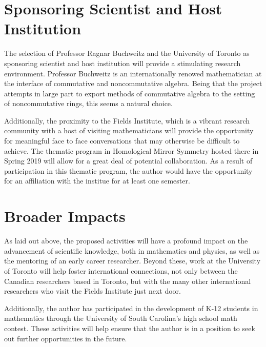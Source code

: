 \documentclass[11pt]{article}
\begin{document}
\section{Sponsoring Scientist and Host Institution}
The selection of Professor Ragnar Buchweitz and the University of Toronto as sponsoring scientist and host institution will provide a stimulating research environment.
Professor Buchweitz is an internationally renowed mathematician at the interface of commutative and noncommutative algebra.
Being that the project attempts in large part to export methods of commutative algebra to the setting of noncommutative rings, this seems a natural choice.

Additionally, the proximity to the Fields Institute, which is a vibrant research community with a host of visiting mathematicians will provide the opportunity for meaningful face to face conversations that may otherwise be difficult to achieve.
The thematic program in Homological Mirror Symmetry hosted there in Spring 2019 will allow for a great deal of potential collaboration.
As a result of participation in this thematic program, the author would have the opportunity for an affiliation with the institue for at least one semester.

\section{Broader Impacts}

As laid out above, the proposed activities will have a profound impact on the advancement of scientific knowledge, both in mathematics and physics, as well as the mentoring of an early career researcher.
Beyond these, work at the University of Toronto will help foster international connections, not only between the Canadian researchers based in Toronto, but with the many other international researchers who visit the Fields Institute just next door.

Additionally, the author has participated in the development of K-12 students in mathematics through the University of South Carolina's high school math contest.
These activities will help ensure that the author is in a position to seek out further opportunities in the future.


\end{document}
